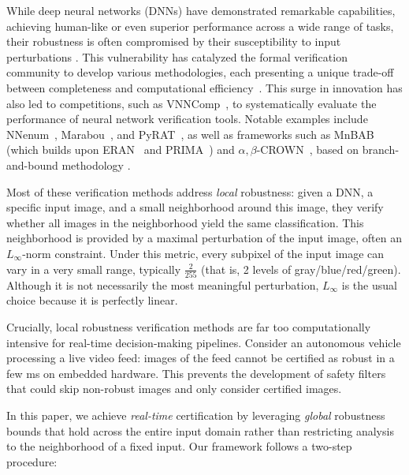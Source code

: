 While deep neural networks (DNNs) have demonstrated remarkable capabilities, achieving human-like or even superior performance across a wide range of tasks, their robustness is often compromised by their susceptibility to input perturbations \citep{szegedy}. This vulnerability has catalyzed the formal verification community to develop various methodologies, each presenting a unique trade-off between completeness and computational efficiency~\citep{Marabou,Reluplex,deeppoly}. 
This surge in innovation has also led to competitions, such as VNNComp~\citep{VNNcomp}, to systematically evaluate the performance of neural network verification tools. Notable examples include NNenum~\citep{nnenum}, Marabou~\citep{Marabou,Marabou2}, and PyRAT~\citep{pyrat}, as well as frameworks such as MnBAB~\citep{ferrari2022complete} (which builds upon ERAN~\citep{deeppoly} and PRIMA~\citep{prima}) and $\alpha,\beta$-CROWN~\citep{crown,xu2020fast}, based on branch-and-bound methodology \citep{BaB}.

Most of these verification methods address {\em local} robustness: given a DNN, a specific input image, and a small neighborhood around this image, they verify whether all images in the neighborhood yield the same classification. This neighborhood is provided by a maximal perturbation of the input image, often an $L_\infty$-norm constraint. Under this metric, every subpixel of the input image can vary in a very small range, typically $\frac{2}{255}$ (that is, 2 levels of gray/blue/red/green). Although it is not necessarily the most meaningful perturbation, $L_\infty$ is the usual choice because it is perfectly linear. 

Crucially, local robustness verification methods are far too computationally intensive for real-time decision-making pipelines. 
Consider an autonomous vehicle processing a live video feed: images of the feed cannot be certified as robust in a few ms on embedded hardware. This prevents the development of safety filters that could skip non-robust images and only consider certified images.

\smallskip

In this paper, we achieve {\em real-time} certification by leveraging {\em global} robustness bounds that hold across the entire input domain rather than restricting analysis to the neighborhood of a fixed input. Our framework follows a two-step procedure:
 
